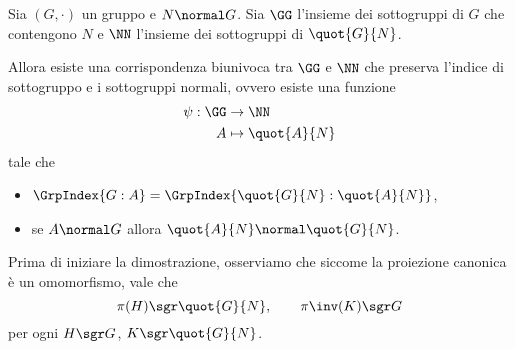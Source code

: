 \begin{theorem}
    \label{th:sgrp_corr}
    Sia $(G, \cdot)$ un gruppo e $N \normal G$. Sia $\GG$ l'insieme dei sottogruppi di $G$ che contengono $N$ e $\NN$ l'insieme dei sottogruppi di $\quot{G}{N}$.

    Allora esiste una corrispondenza biunivoca tra $\GG$ e $\NN$ che preserva l'indice di sottogruppo e i sottogruppi normali, ovvero esiste una funzione \begin{align*}
        \begin{split}
            \psi : \GG &\to \NN\\
            A &\mapsto \quot{A}{N}
        \end{split}
    \end{align*}    
    tale che \begin{itemize}
        \item $\GrpIndex{G:A} = \GrpIndex{\quot{G}{N} : \quot{A}{N}}$,
        \item se $A \normal G$ allora $\quot{A}{N} \normal \quot{G}{N}$.
    \end{itemize}
\end{theorem}
Prima di iniziare la dimostrazione, osserviamo che siccome la proiezione canonica è un omomorfismo, vale che \[
    \pi(H) \sgr \quot{G}{N}, \qquad \pi\inv(K) \sgr G    
\] per ogni $H \sgr G$, $K \sgr \quot{G}{N}$.
